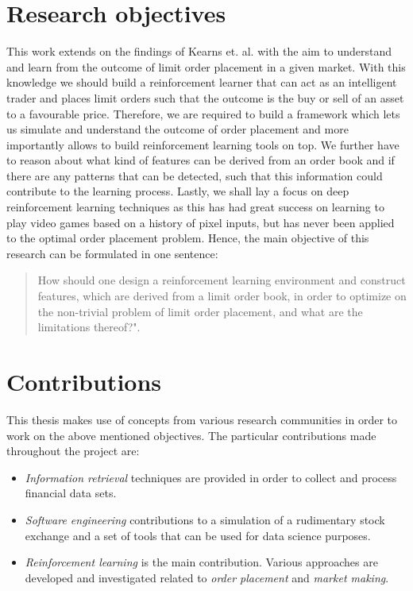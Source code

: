 \section{Research objectives}

This work extends on the findings of Kearns et. al. \cite{nevmyvaka2006reinforcement} with the aim to understand and learn from the outcome of limit order placement in a given market.
With this knowledge we should build a reinforcement learner that can act as an intelligent trader and places limit orders such that the outcome is the buy or sell of an asset to a favourable price.
Therefore, we are required to build a framework which lets us simulate and understand the outcome of order placement and more importantly allows to build reinforcement learning tools on top.
We further have to reason about what kind of features can be derived from an order book and if there are any patterns that can be detected, such that this information could contribute to the learning process.
Lastly, we shall lay a focus on deep reinforcement learning techniques as this has had great success on learning to play video games \cite{mnih2013playing} based on a history of pixel inputs, but has never been applied to the optimal order placement problem.
Hence, the main objective of this research can be formulated in one sentence: \begin{quote}
    How should one design a reinforcement learning environment and construct features, which are derived from a limit order book, in order to optimize on the non-trivial problem of limit order placement, and what are the limitations thereof?".
\end{quote}

\section{Contributions}

This thesis makes use of concepts from various research communities in order to work on the above mentioned objectives.
The particular contributions made throughout the project are:
\begin{itemize}
    \item \textit{Information retrieval} techniques are provided in order to collect and process financial data sets.
    \item \textit{Software engineering} contributions to a simulation of a rudimentary stock exchange and a set of tools that can be used for data science purposes.
    \item \textit{Reinforcement learning} is the main contribution. Various approaches are developed and investigated related to \textit{order placement} and \textit{market making}.
\end{itemize}


